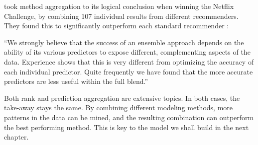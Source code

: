 \citeauthor{Bell2007} took method aggregation to its logical conclusion when winning the Netflix Challenge,
by combining 107 individual results from different recommenders.
They found this to significantly outperform each standard recommender \cite[p.6]{Bell2007}:

\begin{blockquote}
``We strongly believe that the success of an ensemble approach depends on the ability of its various predictors to expose different, 
complementing aspects of the data. Experience shows that this is very different from optimizing the accuracy of each individual predictor. 
Quite frequently we have found that the more accurate predictors are less useful within the full blend.''
\end{blockquote}

Both rank and prediction aggregation are extensive topics.
In both cases, the take-away stays the same.
By combining different modeling methods,
more patterns in the data can be mined, and 
the resulting combination can outperform the best performing method.
This is key to the model we shall build in the next chapter.


